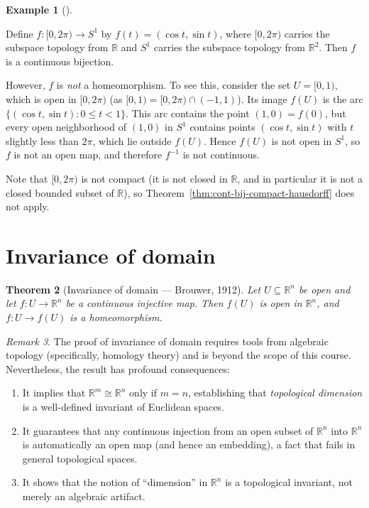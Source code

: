 \documentclass[11pt,a4paper,twoside]{book}
\newtheorem{theorem}{Theorem}[section]
\theoremstyle{remark}
\newtheorem{remark}[theorem]{Remark}
\theoremstyle{definition}
\newtheorem{exampleplain}[theorem]{Example}
\theoremstyle{definition}
\newenvironment{example}[1][]{%
  \begin{exampleplain}[#1]\itshape
}{%
  \end{exampleplain}
}
\begin{document}
\begin{example}
\label{ex:cont-bij-not-homeo}
Define $f\colon[0,2\pi)\to S^1$ by $f(t)=(\cos t,\sin t)$, where $[0,2\pi)$
carries the subspace topology from $\mathbb{R}$ and $S^1$ carries the subspace
topology from $\mathbb{R}^2$.  Then $f$ is a continuous bijection.

However, $f$ is \emph{not} a homeomorphism.  To see this, consider the set
$U=[0,1)$, which is open in $[0,2\pi)$ (as $[0,1)=[0,2\pi)\cap(-1,1)$).
Its image $f(U)$ is the arc $\{(\cos t,\sin t):0\le t<1\}$.  This arc
contains the point $(1,0)=f(0)$, but every open neighborhood of $(1,0)$ in
$S^1$ contains points $(\cos t,\sin t)$ with $t$ slightly less than $2\pi$,
which lie outside $f(U)$.  Hence $f(U)$ is not open in $S^1$, so $f$ is not
an open map, and therefore $f^{-1}$ is not continuous.

Note that $[0,2\pi)$ is not compact (it is not closed in $\mathbb{R}$, and
in particular it is not a closed bounded subset of $\mathbb{R}$), so
Theorem~\ref{thm:cont-bij-compact-hausdorff} does not apply.
\end{example}

\section{Invariance of domain}
\label{sec:invariance-domain}

\begin{theorem}[Invariance of domain --- Brouwer, 1912]
\label{thm:invariance-domain}
Let $U\subseteq\mathbb{R}^n$ be open and let $f\colon U\to\mathbb{R}^n$ be a
continuous injective map.  Then $f(U)$ is open in $\mathbb{R}^n$, and
$f\colon U\to f(U)$ is a homeomorphism.
\end{theorem}

\begin{remark}
\label{rem:invariance-domain-significance}
The proof of invariance of domain requires tools from algebraic topology
(specifically, homology theory) and is beyond the scope of this course.
Nevertheless, the result has profound consequences:
\begin{enumerate}
    \item It implies that $\mathbb{R}^m\cong\mathbb{R}^n$ only if $m=n$,
        establishing that \emph{topological dimension} is a well-defined
        invariant of Euclidean spaces.
    \item It guarantees that any continuous injection from an open subset of
        $\mathbb{R}^n$ into $\mathbb{R}^n$ is automatically an open map (and
        hence an embedding), a fact that fails in general topological spaces.
    \item It shows that the notion of ``dimension'' in $\mathbb{R}^n$ is a
        topological invariant, not merely an algebraic artifact.
\end{enumerate}
\end{remark}
\end{document}
